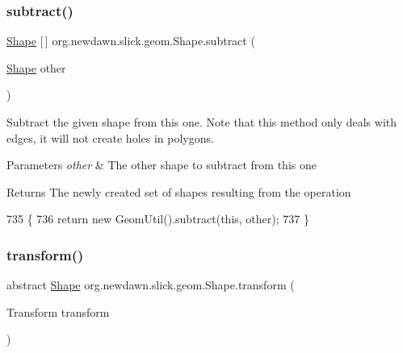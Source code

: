 \subsubsection{\texorpdfstring{subtract()}{subtract()}}
{\footnotesize\ttfamily \mbox{\hyperlink{classorg_1_1newdawn_1_1slick_1_1geom_1_1_shape}{Shape}} \mbox{[}$\,$\mbox{]} org.\+newdawn.\+slick.\+geom.\+Shape.\+subtract (\begin{DoxyParamCaption}\item[{\mbox{\hyperlink{classorg_1_1newdawn_1_1slick_1_1geom_1_1_shape}{Shape}}}]{other }\end{DoxyParamCaption})\hspace{0.3cm}{\ttfamily [inline]}}

Subtract the given shape from this one. Note that this method only deals with edges, it will not create holes in polygons.


\begin{DoxyParams}{Parameters}
{\em other} & The other shape to subtract from this one \\
\hline
\end{DoxyParams}
\begin{DoxyReturn}{Returns}
The newly created set of shapes resulting from the operation 
\end{DoxyReturn}

\begin{DoxyCode}
735                                          \{
736         \textcolor{keywordflow}{return} \textcolor{keyword}{new} GeomUtil().subtract(\textcolor{keyword}{this}, other);
737     \}
\end{DoxyCode}
\mbox{\label{classorg_1_1newdawn_1_1slick_1_1geom_1_1_shape_a463826a085479c379e40f012e970b997}} 
\subsubsection{\texorpdfstring{transform()}{transform()}}
{\footnotesize\ttfamily abstract \mbox{\hyperlink{classorg_1_1newdawn_1_1slick_1_1geom_1_1_shape}{Shape}} org.\+newdawn.\+slick.\+geom.\+Shape.\+transform (\begin{DoxyParamCaption}\item[{Transform}]{transform }\end{DoxyParamCaption})\hspace{0.3cm}{\ttfamily [abstract]}}

